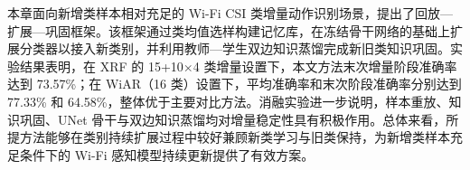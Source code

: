 
本章面向新增类样本相对充足的 Wi-Fi CSI 类增量动作识别场景，提出了回放—扩展—巩固框架。该框架通过类均值选样构建记忆库，在冻结骨干网络的基础上扩展分类器以接入新类别，并利用教师—学生双边知识蒸馏完成新旧类知识巩固。实验结果表明，在 XRF 的 15+10$\times$4 类增量设置下，本文方法末次增量阶段准确率达到 73.57\%；在 WiAR（16 类）设置下，平均准确率和末次阶段准确率分别达到 77.33\% 和 64.58\%，整体优于主要对比方法。消融实验进一步说明，样本重放、知识巩固、UNet 骨干与双边知识蒸馏均对增量稳定性具有积极作用。总体来看，所提方法能够在类别持续扩展过程中较好兼顾新类学习与旧类保持，为新增类样本充足条件下的 Wi-Fi 感知模型持续更新提供了有效方案。

